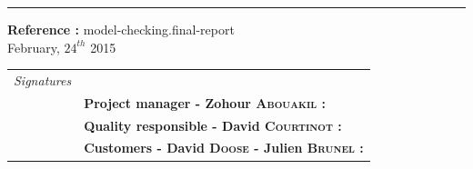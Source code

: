 \documentclass{report}
\begin{document}
\begin{titlepage}


\vspace*{4.5cm}

\noindent
\begin{minipage}{0.35\linewidth}
    \begin{flushright}
        \printauthor
    \end{flushright}
\end{minipage} \hspace{15pt}
%
\begin{minipage}{0.02\linewidth}
    \rule{1pt}{175pt}
\end{minipage} \hspace{-10pt}
%
\begin{minipage}{0.6\linewidth}
\vspace{5pt}
\newenvironment{test}{\begin{center}}{\end{center}}
\hspace{10pt}
\begin{minipage}{\linewidth} 
\textbf{Reference :} model-checking.final-report ~\\
February, $24^{th}$ 2015
\end{minipage}
\end{minipage}

\vspace{8cm}
\begin{minipage}{0.20\linewidth}
    \begin{flushright}
       
        \begin{tabular}{ll}
	 \textit{Signatures} & \\
			& \textbf{Project manager - Zohour \textsc{Abouakil} :} \\
            & \textbf{Quality responsible - David \textsc{Courtinot} :} \\
            & \textbf{Customers - David \textsc{Doose} - Julien \textsc{Brunel} :} \\
        \end{tabular}
    \end{flushright}
\end{minipage}

\end{titlepage}
\restoregeometry
\tableofcontents
{}
\end{document}

